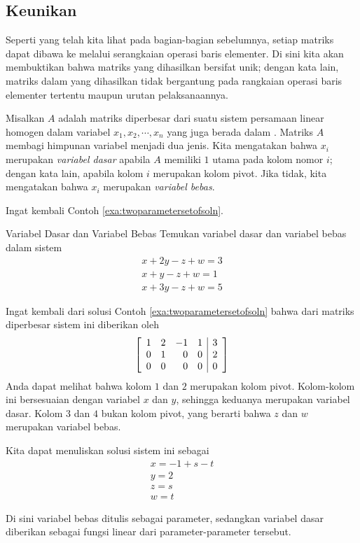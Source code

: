 \subsection{Keunikan \RREF}

Seperti yang telah kita lihat pada bagian-bagian sebelumnya, setiap matriks dapat dibawa ke \rref \;melalui serangkaian operasi baris elementer. Di sini kita akan membuktikan bahwa matriks yang dihasilkan bersifat unik; dengan kata lain, matriks dalam \rref\;yang dihasilkan tidak bergantung pada rangkaian operasi baris elementer tertentu maupun urutan pelaksanaannya.

Misalkan $A$ adalah matriks diperbesar dari suatu sistem persamaan linear
homogen dalam variabel $x_1, x_2, \cdots, x_n$ yang juga berada dalam
\rref. Matriks $A$ membagi himpunan variabel menjadi dua
jenis. Kita mengatakan bahwa $x_i$ merupakan {\em variabel dasar}  apabila $A$ memiliki
$1$ utama pada kolom nomor $i$; dengan kata lain, apabila kolom $i$ merupakan
kolom pivot. Jika tidak, kita mengatakan bahwa $x_i$ merupakan {\em variabel
bebas\em}. 

Ingat kembali Contoh \ref{exa:twoparametersetofsoln}.

\begin{example}{Variabel Dasar dan Variabel Bebas}\label{exa:basicfree}
Temukan variabel dasar dan variabel bebas dalam sistem
\[
\begin{array}{c}
x+2y-z+w=3 \\
x+y-z+w=1 \\
x+3y-z+w=5
\end{array}
\]
\end{example}

\begin{solution}
Ingat kembali dari solusi Contoh \ref{exa:twoparametersetofsoln} bahwa \ef \;dari matriks diperbesar sistem ini diberikan oleh
\[
\left[
\begin{array}{rrrr|r}
1 & 2 & -1 & 1 & 3 \\
0 & 1 & 0 & 0 & 2 \\
0 & 0 & 0 & 0 & 0
\end{array}
\right]  
\]
Anda dapat melihat bahwa kolom $1$ dan $2$ merupakan kolom pivot. Kolom-kolom ini bersesuaian dengan variabel $x$ dan $y$, sehingga keduanya merupakan variabel dasar. Kolom $3$ dan $4$ bukan kolom pivot, yang berarti bahwa $z$ dan $w$ merupakan variabel bebas.

Kita dapat menuliskan solusi sistem ini sebagai
\[
\begin{array}{c}
x=-1+s-t \\
y=2 \\
z=s \\
w=t
\end{array}
\]

Di sini variabel bebas ditulis sebagai parameter, sedangkan variabel dasar diberikan sebagai fungsi linear dari parameter-parameter tersebut.
\end{solution}

